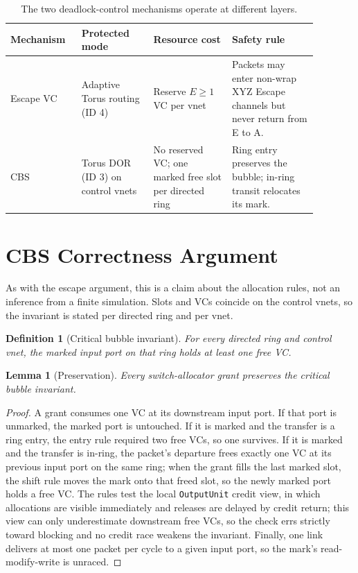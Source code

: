 \documentclass[10pt]{article}
\newtheorem{definition}{Definition}
\newtheorem{lemma}{Lemma}
\begin{document}
\begin{table}[H]
\centering
\small
\caption{The two deadlock-control mechanisms operate at different layers.}
\label{tab:mechanism-contrast}
\begin{tabular}{p{0.19\linewidth}p{0.21\linewidth}p{0.23\linewidth}p{0.25\linewidth}}
\toprule
Mechanism & Protected mode & Resource cost & Safety rule \\
\midrule
Escape VC & Adaptive Torus routing (ID 4) & Reserve $E\ge1$ VC per vnet &
Packets may enter non-wrap XYZ Escape channels but never return from E to A. \\
CBS & Torus DOR (ID 3) on control vnets & No reserved VC; one marked free slot per directed ring &
Ring entry preserves the bubble; in-ring transit relocates its mark. \\
\bottomrule
\end{tabular}
\end{table}

\section{CBS Correctness Argument}
As with the escape argument, this is a claim about the allocation rules, not
an inference from a finite simulation. Slots and VCs coincide on the control
vnets, so the invariant is stated per directed ring and per vnet.

\begin{definition}[Critical bubble invariant]
For every directed ring and control vnet, the marked input port on that ring
holds at least one free VC.
\end{definition}

\begin{lemma}[Preservation]
Every switch-allocator grant preserves the critical bubble invariant.
\end{lemma}
\begin{proof}
A grant consumes one VC at its downstream input port. If that port is
unmarked, the marked port is untouched. If it is marked and the transfer is a
ring entry, the entry rule required two free VCs, so one survives. If it is
marked and the transfer is in-ring, the packet's departure frees exactly one
VC at its previous input port on the same ring; when the grant fills the last
marked slot, the shift rule moves the mark onto that freed slot, so the newly
marked port holds a free VC. The rules test the local \texttt{OutputUnit}
credit view, in which allocations are visible immediately and releases are
delayed by credit return; this view can only underestimate downstream free
VCs, so the check errs strictly toward blocking and no credit race weakens
the invariant. Finally, one link delivers at most one packet per cycle to a
given input port, so the mark's read-modify-write is unraced.
\end{proof}
\end{document}
